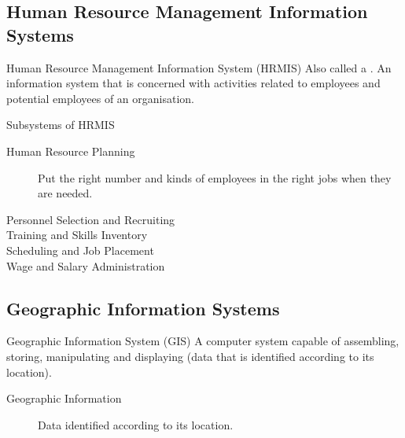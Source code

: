 \documentclass[\main/notes.tex]{subfiles}
\begin{document}
			\subsection{Human Resource Management Information Systems}
				\begin{definition}{Human Resource Management Information System (HRMIS)}
					Also called a . An information system that is concerned with activities related to employees and potential employees of an organisation.
				\end{definition}
				\begin{sidenote}{Subsystems of HRMIS}
					\begin{description}
						\item[Human Resource Planning] Put the right number and kinds of employees in the right jobs when they are needed.
						\item[Personnel Selection and Recruiting]
						\item[Training and Skills Inventory]
						\item[Scheduling and Job Placement]
						\item[Wage and Salary Administration]  
					\end{description}
				\end{sidenote}
			\subsection{Geographic Information Systems}
				\begin{definition}{Geographic Information System (GIS)}
					A computer system capable of assembling, storing, manipulating and displaying  (data that is identified according to its location).
					\begin{description}
						\item[Geographic Information] Data identified according to its location.
					\end{description}
				\end{definition}

	\vbox{}
\end{document}
